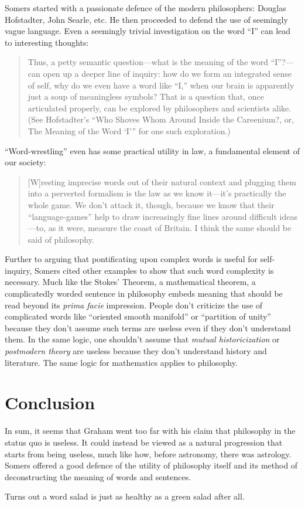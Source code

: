 \documentclass[12pt]{article}
\begin{document}
Somers started with a passionate defence of the modern philosophers: Douglas Hofstadter, John Searle, etc. He then proceeded to defend the use of seemingly vague language. Even a seemingly trivial investigation on the word \enquote{I} can lead to interesting thoughts:
\begin{quotation}
 Thus, a petty semantic question—what is the meaning of the word \enquote{I}?—can open up a deeper line of inquiry: how do we form an integrated sense of self, why do we even have a word like “I,” when our brain is apparently just a soup of meaningless symbols? That is a question that, once articulated properly, can be explored by philosophers and scientists alike. (See Hofstadter’s “Who Shoves Whom Around Inside the Careenium?, or, The Meaning of the Word ‘I’” for one such exploration.)
\end{quotation}

\enquote{Word-wrestling} even has some practical utility in law, a fundamental element of our society:

\begin{quotation}
 [W]resting imprecise words out of their natural context and plugging them into a perverted formalism is the law as we know it—it’s practically the whole game. We don’t attack it, though, because we know that their “language-games” help to draw increasingly fine lines around difficult ideas—to, as it were, measure the coast of Britain. I think the same should be said of philosophy.
\end{quotation}

Further to arguing that pontificating upon complex words is useful for self-inquiry, Somers cited other examples to show that such word complexity is necessary. Much like the Stokes' Theorem, a mathematical theorem, a complicatedly worded sentence in philosophy embeds meaning that should be read beyond its \emph{prima facie} impression. People don't criticize the use of complicated words like \enquote{oriented smooth manifold} or \enquote{partition of unity} because they don't assume such terms are useless even if they don't understand them. In the same logic, one shouldn't assume that \emph{mutual historicization} or \emph{postmodern theory} are useless because they don't understand history and literature. The same logic for mathematics applies to philosophy.

\section{Conclusion}

In sum, it seems that Graham went too far with his claim that philosophy in the status quo is useless. It could instead be viewed as a natural progression that starts from being useless, much like how, before astronomy, there was astrology. Somers offered a good defence of the utility of philosophy itself and its method of deconstructing the meaning of words and sentences.

Turns out a word salad is just as healthy as a green salad after all.

\end{document}
